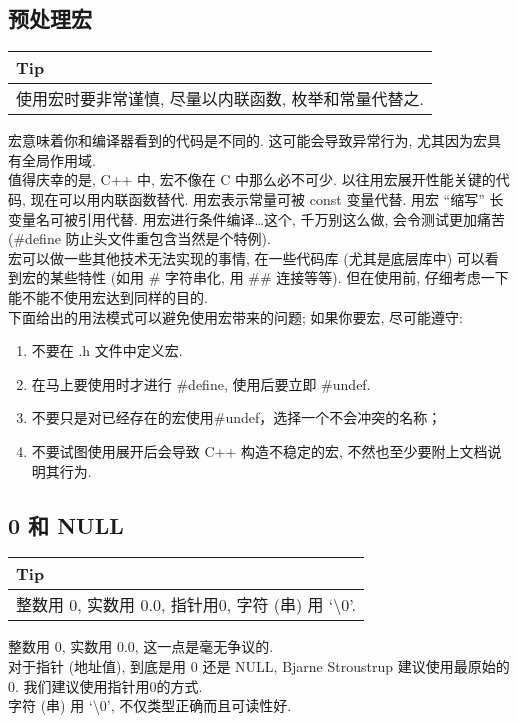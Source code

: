 \documentclass[a4paper,11pt,CJK]{article}
\begin{document}
\begin{CJK}{UTF8}{gbsn}
\subsection{预处理宏}
\begin{table}[htbp]
\flushleft
\begin{tabular}{p{400pt}}
\toprule
\rowcolor[gray]{.8} Tip \\
\midrule
使用宏时要非常谨慎, 尽量以内联函数, 枚举和常量代替之.\\
\bottomrule
\end{tabular}
\end{table}
宏意味着你和编译器看到的代码是不同的. 这可能会导致异常行为, 尤其因为宏具有全局作用域.\\
\indent 值得庆幸的是, C++ 中, 宏不像在 C 中那么必不可少. 以往用宏展开性能关键的代码, 现在可以用内联函数替代. 用宏表示常量可被 const 变量代替. 用宏 ``缩写'' 长变量名可被引用代替. 用宏进行条件编译\dots 这个, 千万别这么做, 会令测试更加痛苦 (\#define 防止头文件重包含当然是个特例).\\
\indent 宏可以做一些其他技术无法实现的事情, 在一些代码库 (尤其是底层库中) 可以看到宏的某些特性 (如用 \# 字符串化, 用 \#\# 连接等等). 但在使用前, 仔细考虑一下能不能不使用宏达到同样的目的.\\
\indent 下面给出的用法模式可以避免使用宏带来的问题; 如果你要宏, 尽可能遵守:\\
\begin{enumerate}
\item
不要在 .h 文件中定义宏.
\item
在马上要使用时才进行 \#define, 使用后要立即 \#undef.
\item
不要只是对已经存在的宏使用\#undef，选择一个不会冲突的名称；
\item
不要试图使用展开后会导致 C++ 构造不稳定的宏, 不然也至少要附上文档说明其行为.
\end{enumerate}

\subsection{0 和 NULL}
\begin{table}[htbp]
\flushleft
\begin{tabular}{p{400pt}}
\toprule
\rowcolor[gray]{.8} Tip \\
\midrule
整数用 0, 实数用 0.0, 指针用0, 字符 (串) 用 `\textbackslash 0'.
\\
\bottomrule
\end{tabular}
\end{table}
整数用 0, 实数用 0.0, 这一点是毫无争议的.\\
\indent 对于指针 (地址值), 到底是用 0 还是 NULL, Bjarne Stroustrup 建议使用最原始的 0. 我们建议使用指针用0的方式.\\
\indent 字符 (串) 用 `\textbackslash 0', 不仅类型正确而且可读性好.\\


\end{CJK}
\end{document}

